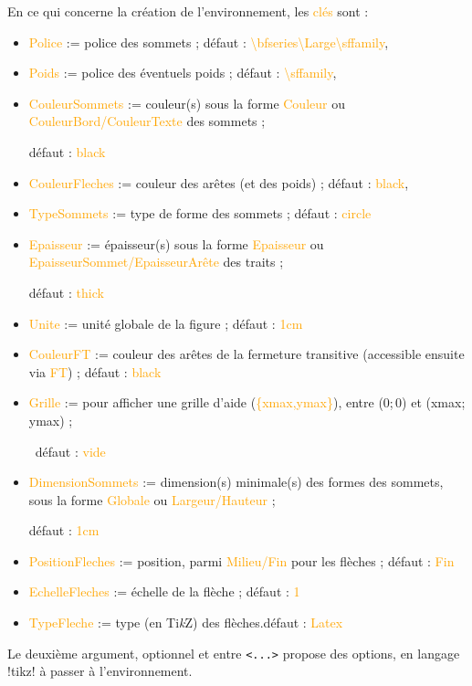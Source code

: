 \documentclass[french,a4paper,11pt]{article}
\providecommand\tikzlogo{Ti\textit{k}Z}
\let\TikZ\tikzlogo
\newcommand\Cle[1]{{\small\sffamily\textlangle \textcolor{orange}{#1}\textrangle}}
\begin{document}
\begin{tipblock}
En ce qui concerne la création de l'environnement, les \Cle{clés} sont :

\begin{itemize}
	\item \Cle{Police} := police des sommets ; \hfill{}défaut : \Cle{\textbackslash bfseries\textbackslash Large\textbackslash sffamily},%
	\item \Cle{Poids} := police des éventuels poids ; \hfill{}défaut : \Cle{\textbackslash sffamily},%
	\item \Cle{CouleurSommets} := couleur(s) sous la forme \Cle{Couleur} ou \Cle{CouleurBord/CouleurTexte} des sommets ;
	
	\hfill{}défaut : \Cle{black}
	\item \Cle{CouleurFleches} := couleur des arêtes (et des poids) ; \hfill{}défaut : \Cle{black},%
	\item \Cle{TypeSommets} := type de forme des sommets ; \hfill{}défaut : \Cle{circle}
	\item \Cle{Epaisseur} := épaisseur(s) sous la forme \Cle{Epaisseur} ou \Cle{EpaisseurSommet/EpaisseurArête} des traits ;
	
	\hfill{}défaut : \Cle{thick}
	\item \Cle{Unite} := unité globale de la figure ; \hfill{}défaut : \Cle{1cm}
	\item \Cle{CouleurFT} := couleur des arêtes de la fermeture transitive (accessible ensuite via \Cle{FT}) ; \hfill{}défaut : \Cle{black}
	\item \Cle{Grille} := pour afficher une grille d'aide (\Cle{\{xmax,ymax\}}), entre (0;\,0) et (xmax;\,ymax) ;
	
	\hfill~défaut : \Cle{vide}
	\item \Cle{DimensionSommets} := dimension(s) minimale(s) des formes des sommets, sous la forme \Cle{Globale} ou \Cle{Largeur/Hauteur} ;
	
	\hfill{}défaut : \Cle{1cm}
	\item \Cle{PositionFleches} := position, parmi \Cle{Milieu/Fin} pour les flèches ; \hfill{}défaut : \Cle{Fin}
	\item \Cle{EchelleFleches} := échelle de la flèche ; \hfill{}défaut : \Cle{1}
	\item \Cle{TypeFleche} := type (en \TikZ) des flèches.\hfill{}défaut : \Cle{Latex}
\end{itemize}

Le deuxième argument, optionnel et entre \texttt{<...>} propose des options, en langage \packagetex!tikz! à passer à l'environnement.
\end{tipblock}
\end{document}
